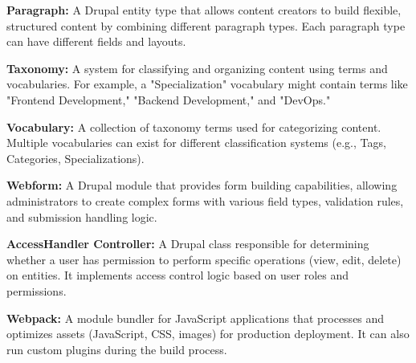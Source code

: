 \textbf{Paragraph:} A Drupal entity type that allows content creators to build flexible, structured content by combining different paragraph types. Each paragraph type can have different fields and layouts.

\textbf{Taxonomy:} A system for classifying and organizing content using terms and vocabularies. For example, a "Specialization" vocabulary might contain terms like "Frontend Development," "Backend Development," and "DevOps."

\textbf{Vocabulary:} A collection of taxonomy terms used for categorizing content. Multiple vocabularies can exist for different classification systems (e.g., Tags, Categories, Specializations).

\textbf{Webform:} A Drupal module that provides form building capabilities, allowing administrators to create complex forms with various field types, validation rules, and submission handling logic.


\textbf{AccessHandler Controller:} A Drupal class responsible for determining whether a user has permission to perform specific operations (view, edit, delete) on entities. It implements access control logic based on user roles and permissions.


\textbf{Webpack:} A module bundler for JavaScript applications that processes and optimizes assets (JavaScript, CSS, images) for production deployment. It can also run custom plugins during the build process.
